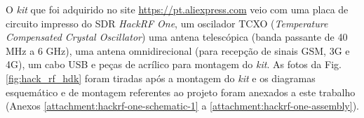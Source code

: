 \documentclass[
  12pt,				%
  openright,			%
  twoside,			%
  a4paper,			%
  english,			%
  french,				%
  spanish,			%
  brazil,				%
  ]{abntex2}
\begin{document}
O \textit{kit} que foi adquirido no site \href{https://pt.aliexpress.com}{https://pt.aliexpress.com} veio com uma placa de circuito impresso do SDR \textit{HackRF One}, um oscilador TCXO (\textit{Temperature Compensated Crystal Oscillator})
uma antena telescópica (banda passante de 40 MHz a 6 GHz), uma antena omnidirecional (para recepção de sinais GSM, 3G e 4G), um cabo USB e peças de acrílico para montagem do \textit{kit}. As fotos da Fig.
\ref{fig:hack_rf_hdk} foram tiradas após a montagem do \textit{kit} e os diagramas esquemático e de montagem referentes ao projeto foram anexados a este trabalho (Anexos \ref{attachment:hackrf-one-schematic-1} a \ref{attachment:hackrf-one-assembly}).






\end{document}
